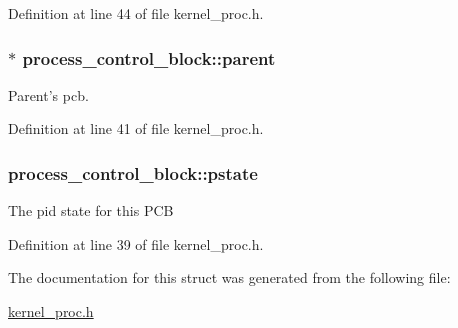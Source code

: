 Definition at line 44 of file kernel\-\_\-proc.\-h.

\hypertarget{structprocess__control__block_af20d0c36862c6def80024b4586ff8934}{
\subsubsection[{parent}]{$\ast$ process\-\_\-control\-\_\-block\-::parent}}\label{structprocess__control__block_af20d0c36862c6def80024b4586ff8934}
Parent's pcb. 

Definition at line 41 of file kernel\-\_\-proc.\-h.

\hypertarget{structprocess__control__block_ae3334dd8a5747f108124c7129c27eea5}{
\subsubsection[{pstate}]{ process\-\_\-control\-\_\-block\-::pstate}}\label{structprocess__control__block_ae3334dd8a5747f108124c7129c27eea5}
The pid state for this P\-C\-B 

Definition at line 39 of file kernel\-\_\-proc.\-h.



The documentation for this struct was generated from the following file\-:\begin{DoxyCompactItemize}
\item 
\hyperlink{kernel__proc_8h}{kernel\-\_\-proc.\-h}\end{DoxyCompactItemize}
